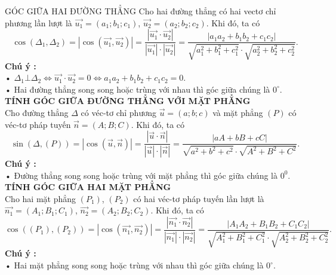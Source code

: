 \begin{dang}{GÓC GIỮA HAI ĐƯỜNG THẲNG}
	Cho hai đường thẳng có hai vectơ chỉ phương lần lượt là $\overrightarrow {u_1}=(a_1;{b_1};{c_1})$, $\overrightarrow{ u_2}=(a_2;{b_2};{c_2})$. Khi đó, ta có
	$$\cos\left(\Delta_1,\Delta_2\right)=\left|\cos\left(\overrightarrow {u_1}, \overrightarrow{ u_2} \right)\right|=\dfrac{\left|\overrightarrow {u_1}\cdot \overrightarrow{u_2}\right|}{\left|\overrightarrow {u_1}\right|\cdot \left|\overrightarrow {u_2}\right|}=\dfrac{\left|a_1a_2+b_1b_2+c_1c_2 \right| }{\sqrt{a_1^2+b_1^2+c_1^2}\cdot \sqrt{a_2^2+b_2^2+c_2^2}}.$$
	\textbf{Chú ý :}\\
	• $\Delta_1\bot{\Delta_2}\Leftrightarrow{\overrightarrow {u_1}}\cdot \overrightarrow {u_2}=0\Leftrightarrow{a_1}{a_2}+b_1b_2+c_1c_2=0.$\\
	• Hai đường thẳng song song hoặc trùng với nhau thì góc giữa chúng là $0^\circ$.\\
	\textbf{TÍNH GÓC GIỮA ĐƯỜNG THẲNG VỚI MẶT PHẲNG}\\
	Cho đường thẳng $\Delta $ có véc-tơ chỉ phương $\overrightarrow {u}=(a;b;c)$ và mặt phẳng $(P)$ có véc-tơ pháp tuyến $\overrightarrow {n}=(A; B; C)$. Khi đó, ta có
	$$\sin\left(\Delta ,(P)\right)=\left|\cos\left(\overrightarrow {u}, \overrightarrow{n}\right)\right|=\dfrac{\left|\overrightarrow {u} \cdot\overrightarrow {n}\right|}{\left|\overrightarrow {u}\right| \cdot \left| \overrightarrow {n}\right|}=\dfrac{\left|aA+bB+cC\right|}{\sqrt{a^2+b^2+c^2}\cdot \sqrt{A^2+B^2+C^2}}.$$
	\textbf{Chú ý :}\\
	• Đường thẳng song song hoặc trùng với mặt phẳng thì góc giữa chúng là $0^0$.\\
	\textbf{TÍNH GÓC GIỮA HAI MẶT PHẲNG}\\
	Cho hai mặt phẳng $(P_1)$, $(P_2)$ có hai véc-tơ pháp tuyến lần lượt là \break  $\overrightarrow{n_1}=(A_1;B_1;C_1)$, $ \overrightarrow{n_2}=(A_2;B_2;C_2)$. Khi đó, ta có
	$$ \cos\left((P_1),(P_2)\right)=\left|\cos\left( \overrightarrow{n_1} , \overrightarrow{n_2} \right)\right|=\dfrac{\left|\overrightarrow{n_1}\cdot \overrightarrow{n_2}\right|}{\left|\overrightarrow{n_1}\right|\cdot \left|\overrightarrow {n_2}\right|}=\dfrac{\left|A_1A_2+B_1B_2+C_1C_2\right|}{\sqrt{A_1^2+B_1^2+C_1^2}\cdot \sqrt{A_2^2+B_2^2+C_2^2}}.$$
	\textbf{Chú ý :}\\
	• Hai mặt phẳng song song hoặc trùng với nhau thì góc giữa chúng là $0^\circ$.
\end{dang}

